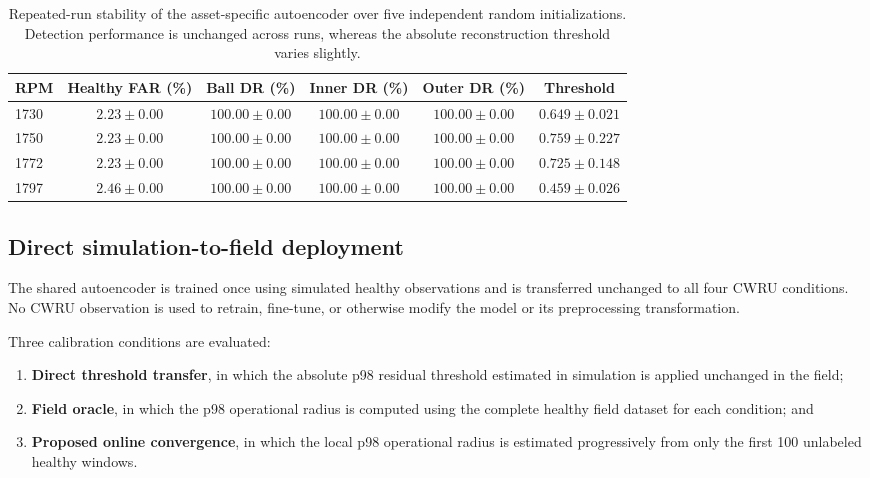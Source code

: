 \documentclass[11pt,a4paper]{article}
\begin{document}
\begin{table}[H]
\centering
\caption{Repeated-run stability of the asset-specific autoencoder over five
independent random initializations. Detection performance is unchanged across
runs, whereas the absolute reconstruction threshold varies slightly.}
\label{tab:ae-stability}

\begin{tabular}{lccccc}
\toprule
RPM &
Healthy FAR (\%) &
Ball DR (\%) &
Inner DR (\%) &
Outer DR (\%) &
Threshold \\
\midrule
1730 &
$2.23 \pm 0.00$ &
$100.00 \pm 0.00$ &
$100.00 \pm 0.00$ &
$100.00 \pm 0.00$ &
$0.649 \pm 0.021$ \\

1750 &
$2.23 \pm 0.00$ &
$100.00 \pm 0.00$ &
$100.00 \pm 0.00$ &
$100.00 \pm 0.00$ &
$0.759 \pm 0.227$ \\

1772 &
$2.23 \pm 0.00$ &
$100.00 \pm 0.00$ &
$100.00 \pm 0.00$ &
$100.00 \pm 0.00$ &
$0.725 \pm 0.148$ \\

1797 &
$2.46 \pm 0.00$ &
$100.00 \pm 0.00$ &
$100.00 \pm 0.00$ &
$100.00 \pm 0.00$ &
$0.459 \pm 0.026$ \\

\bottomrule
\end{tabular}
\end{table}

\subsection{Direct simulation-to-field deployment}
\label{sec:shared-deployment-results}

The shared autoencoder is trained once using simulated healthy observations and is transferred
unchanged to all four CWRU conditions. No CWRU observation is used to retrain, fine-tune, or
otherwise modify the model or its preprocessing transformation.

Three calibration conditions are evaluated:

\begin{enumerate}[leftmargin=1.5em]
    \item \textbf{Direct threshold transfer}, in which the absolute p98 residual threshold
    estimated in simulation is applied unchanged in the field;
    \item \textbf{Field oracle}, in which the p98 operational radius is computed using the
    complete healthy field dataset for each condition; and
    \item \textbf{Proposed online convergence}, in which the local p98 operational radius is
    estimated progressively from only the first 100 unlabeled healthy windows.
\end{enumerate}
\end{document}
